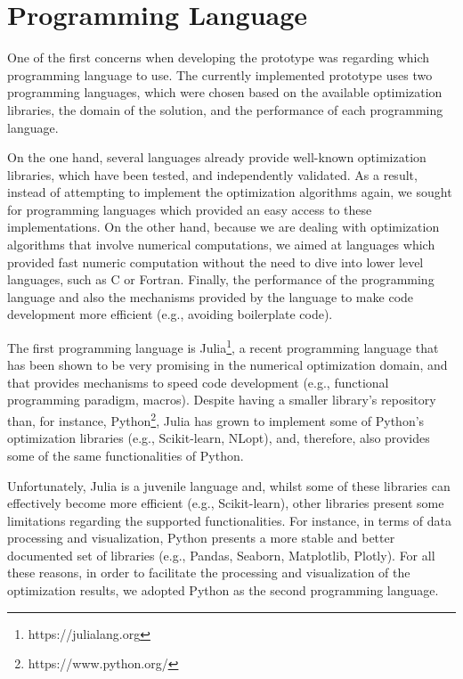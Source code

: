 \section{Programming Language}

One of the first concerns when developing the prototype was regarding which programming language to use. The currently implemented prototype uses two programming languages, which were chosen based on the available optimization libraries, the domain of the solution, and the performance of each programming language.
 
On the one hand, several languages already provide well-known optimization libraries, which have been tested, and independently validated. As a result, instead of attempting to implement the optimization algorithms again, we sought for programming languages which provided an easy access to these implementations. On the other hand, because we are dealing with optimization algorithms that involve numerical computations, we aimed at languages which provided fast numeric computation without the need to dive into lower level languages, such as C or Fortran. Finally, the performance of the programming language and also the mechanisms provided by the language to make code development more efficient (e.g., avoiding boilerplate code).

The first programming language is Julia\footnote{https://julialang.org}, a recent programming language that has been shown to be very promising in the numerical optimization domain, and that provides mechanisms to speed code development (e.g., functional programming paradigm, macros). Despite having a smaller library's repository than, for instance, Python\footnote{https://www.python.org/}, Julia has grown to implement some of Python's optimization libraries (e.g., Scikit-learn, NLopt), and, therefore, also provides some of the same functionalities of Python.   

Unfortunately, Julia is a juvenile language and, whilst some of these libraries can effectively become more efficient (e.g., Scikit-learn), other libraries present some limitations regarding the supported functionalities. For instance, in terms of data processing and visualization, Python presents a more stable  and better documented set of libraries (e.g., Pandas, Seaborn, Matplotlib, Plotly). For all these reasons, in order to facilitate the processing and visualization of the optimization results, we adopted Python as the second programming language.


